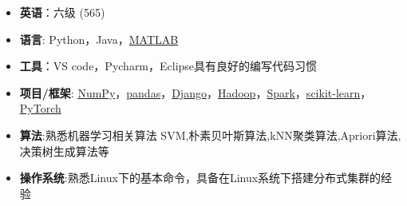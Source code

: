   \begin{itemize}[leftmargin=*]
    \item \textbf{英语}：六级 {\color{labelgrey}(565)}
    \item \textbf{语言}: Python，Java，\href{https://www.mathworks.com/}{MATLAB}
    \item \textbf{工具}：VS code，Pycharm，Eclipse具有良好的编写代码习惯 
    \item \textbf{项目/框架}: \href{http://www.numpy.org/}{NumPy}，\href{https://pandas.pydata.org/}{pandas}，\href{https://www.djangoproject.com/}{Django}，\href{http://hadoop.apache.org/}{Hadoop}，\href{http://spark.apache.org/}{Spark}，\href{http://scikit-learn.org//}{scikit-learn}，\href{https://pytorch.org/}{PyTorch}
    \item \textbf{算法}:熟悉机器学习相关算法 SVM,朴素贝叶斯算法,kNN聚类算法,Apriori算法,决策树生成算法等
    \item \textbf{操作系统}:熟悉Linux下的基本命令，具备在Linux系统下搭建分布式集群的经验 \\
  \end{itemize}

